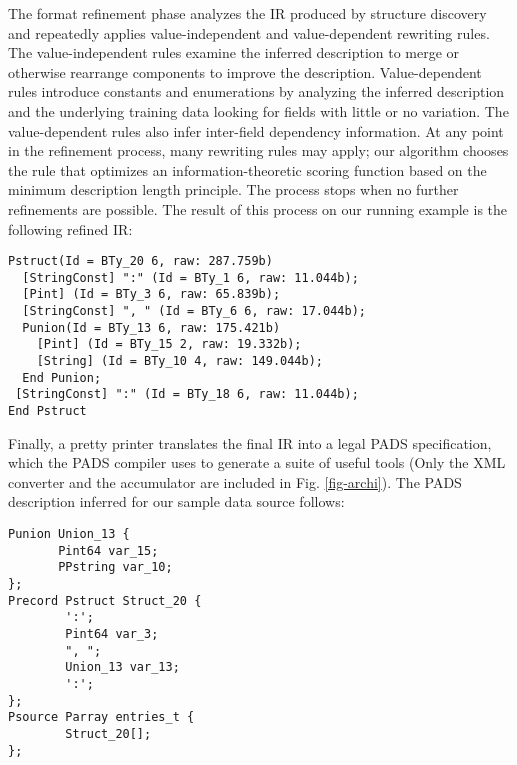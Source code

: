 \documentclass[preprint]{sig-alternate-sigmod08}
\begin{document}
The format refinement phase analyzes the IR produced by structure discovery
and repeatedly applies value-independent and value-dependent
rewriting rules. 
The value-independent rules examine the inferred description 
to merge or otherwise rearrange components to improve the description.
Value-dependent rules introduce constants and enumerations by
analyzing the inferred description and the underlying
training data looking for fields with little or no 
variation. The value-dependent rules also infer
inter-field dependency information.
At any point in the refinement process,
many rewriting rules may apply; our algorithm chooses the rule
that optimizes an information-theoretic
scoring function based on the minimum description length
principle. The process stops when no further refinements are possible.
The result of this process on our running example is the following
refined IR:
\vspace*{5mm}

{\small
\begin{verbatim}
Pstruct(Id = BTy_20 6, raw: 287.759b)
  [StringConst] ":" (Id = BTy_1 6, raw: 11.044b);
  [Pint] (Id = BTy_3 6, raw: 65.839b);
  [StringConst] ", " (Id = BTy_6 6, raw: 17.044b);
  Punion(Id = BTy_13 6, raw: 175.421b)
    [Pint] (Id = BTy_15 2, raw: 19.332b);
    [String] (Id = BTy_10 4, raw: 149.044b);
  End Punion;
 [StringConst] ":" (Id = BTy_18 6, raw: 11.044b);
End Pstruct
\end{verbatim}
}

Finally, a pretty printer translates the final IR into a legal PADS 
specification,  which the PADS compiler uses to generate
a suite of useful tools (Only the XML converter and the accumulator are included
in Fig. \ref{fig-archi}).  The PADS description inferred for our
sample data source follows:

{\small
\begin{verbatim}
Punion Union_13 {
       Pint64 var_15;
       PPstring var_10;
};
Precord Pstruct Struct_20 {
        ':';
        Pint64 var_3;
        ", ";
        Union_13 var_13;
        ':';
};
Psource Parray entries_t {
        Struct_20[];
};
\end{verbatim}
}






\end{document}
